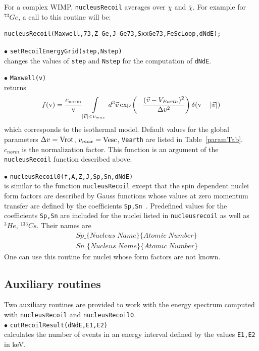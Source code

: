 \documentclass[12pt,a4paper]{article}
\begin{document}
For a complex WIMP, \verb|nucleusRecoil| averages over $\chi$ and
$\overline{\chi}$. For example for $^{73}Ge$, a call to this routine will be: 
\begin{verbatim}
nucleusRecoil(Maxwell,73,Z_Ge,J_Ge73,SxxGe73,FeScLoop,dNdE);
\end{verbatim}


\noindent
$\bullet$ \verb|setRecoilEnergyGrid(step,Nstep)| \\
changes the values of \verb|step| and \verb|Nstep| for the computation of \verb|dNdE|.


\noindent
$\bullet$ \verb|Maxwell(v)| \\
returns   
$$f(\mbox{v})= \frac{c_{\rm{norm}}}{\mbox{v}}\int\limits_{|\vec{v}|<v_{max}} d^3\vec{v} \exp\left(
-\frac{(\vec{v}-V_{Earth})^2}{\Delta v^2}\right)\delta(\mbox{v} -|\vec{v}|)
$$
which corresponds to the isothermal model. Default values for the global parameters 
$\Delta v ={\rm Vrot}$,  $v_{max}={\rm Vesc}$, \verb|Vearth| are listed in Table~\ref{paramTab}.
$c_{norm}$ is the normalization factor.  This function is an
argument of the \verb|nucleusRecoil| function described above.


\noindent
$\bullet$ \verb|nucleusRecoil0(f,A,Z,J,Sp,Sn,dNdE)|\\
is similar to the  function \verb|nucleusRecoil| except that 
the spin dependent nuclei form factors are described by Gauss functions
whose values  at zero momentum transfer are defined by the coefficients \verb|Sp,Sn|~\cite{Belanger:2008sj}. 
Predefined values for the coefficients \verb|Sp,Sn| are included for the
nuclei listed in \verb|nucleusrecoil| as well as ${}^3He$, ${}^{133}Cs$. Their  names are 
\begin{eqnarray}
    &&Sp\_\{Nucleus\; Name\}\{Atomic \;Number\} \nonumber\\
    &&Sn\_\{Nucleus\; Name\}\{Atomic\; Number\} \nonumber
\end{eqnarray}
One can use this routine for nuclei whose form factors  are not known. 



\subsection{Auxiliary routines}
Two auxiliary routines are provided to work with the energy
spectrum computed with
\verb|nucleusRecoil| and  \verb|nucleusRecoil0|.\\
%
\noindent
$\bullet$ \verb|cutRecoilResult(dNdE,E1,E2)|\\
calculates the number of events in an energy interval defined by the
values \verb|E1,E2| in keV.
\end{document}
